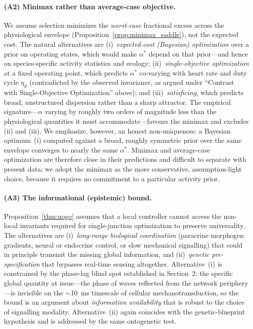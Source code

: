 \paragraph{(A2) Minimax rather than average-case objective.}
We assume selection minimizes the \emph{worst-case} fractional excess
across the physiological envelope (Proposition~\ref{prop:minimax_saddle}), not
the expected cost. The natural alternatives are (i)~\emph{expected-cost
(Bayesian) optimization} over a prior on operating states, which would make
$\alpha^*$ depend on that prior---and hence on species-specific activity
statistics and ecology; (ii)~\emph{single-objective optimization} at a fixed
operating point, which predicts $\alpha^*$ co-varying with heart rate and duty
cycle $\eta_d$ (contradicted by the observed invariance, as argued under
``Contrast with Single-Objective Optimization'' above); and
(iii)~\emph{satisficing}, which predicts broad, unstructured dispersion rather
than a sharp attractor. The empirical signature---$\alpha$ varying by roughly
two orders of magnitude less than the physiological quantities it must
accommodate---favours the minimax and excludes (ii) and (iii). We emphasize,
however, an honest non-uniqueness: a Bayesian optimum~(i) computed against a
broad, roughly symmetric prior over the same envelope converges to nearly the
same $\alpha^*$. Minimax and average-case optimization are therefore close in
their predictions and difficult to separate with present data; we adopt the
minimax as the more conservative, assumption-light choice, because it requires
no commitment to a particular activity prior.

\paragraph{(A3) The informational (epistemic) bound.}
Proposition~\ref{thm:nogo} assumes that a local controller cannot access
the non-local invariants required for single-junction optimization to preserve
universality. The alternatives are (i)~\emph{long-range biological coordination}
(paracrine morphogen gradients, neural or endocrine control, or slow mechanical
signalling) that could in principle transmit the missing global information, and
(ii)~\emph{genetic pre-specification} that bypasses real-time sensing
altogether. Alternative~(i) is constrained by the phase-lag blind spot
established in Section~2: the specific global quantity at issue---the phase of
waves reflected from the network periphery---is invisible on the $\sim$10~ms
timescale of cellular mechanotransduction, so the bound is an argument about
\emph{information availability} that is robust to the choice of signalling
modality. Alternative~(ii) again coincides with the genetic-blueprint hypothesis
and is addressed by the same ontogenetic test.

